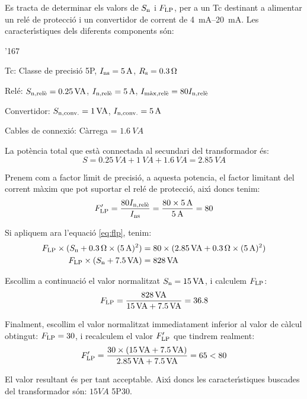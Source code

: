 \begin{exemple}
    Es tracta de determinar els valors de $S_\mathrm{n}$ i $F_\mathrm{LP}$,  per
    a un Tc destinant a alimentar  un rel\'{e} de protecci\'{o} i un convertidor
    de corrent de \SIrange{4}{20}{mA}. Les caracter\'{\i}stiques
    dels diferents components s\'{o}n:
    \begin{dinglist}{'167}
        \item Tc: Classe de precisi\'{o}  5P, $I_\mathrm{ns}=5\mathrm{\,A}$,
        $R_\mathrm{s}=\SI{0,3}{\ensuremath{\mathrm{\Omega}}}$
        \item Rel\'{e}: $S_\mathrm{n,rel\grave{e}}=\SI{0,25}{VA}$,
        $I_\mathrm{n,rel\grave{e}}=5\mathrm{\,A}$, $I_\mathrm{m\grave{a}x,rel\grave{e}}=
        80 I_\mathrm{n,rel\grave{e}}$
        \item Convertidor: $S_\mathrm{n,conv.}=1\mathrm{\,VA}$,
        $I_\mathrm{n,conv.}=5\mathrm{\,A}$
        \item Cables de connexi\'{o}: C\`{a}rrega = $\SI{1,6}{VA}$
    \end{dinglist}

    La pot\`{e}ncia total que est\`{a} connectada al secundari del transformador
    \'{e}s:
    \[
        S = \SI{0,25}{VA} + \SI{1}{VA} + \SI{1,6}{VA} = \SI{2,85}{VA}
    \]

    Prenem com a factor l\'{\i}mit de precisi\'{o},  a aquesta potencia, el
    factor limitant del corrent m\`{a}xim que pot suportar el rel\'{e} de
    protecci\'{o}, aix\'{\i} doncs tenim:
    \[
        F'_\mathrm{LP} = \frac{80 I_\mathrm{n,rel\grave{e}}}{I_\mathrm{ns}} =
        \frac{80\times 5\mathrm{\,A}}{5\mathrm{\,A}} = 80
    \]

    Si apliquem ara l'equaci\'{o} \eqref{eq:flp}, tenim:
    \begin{align*}
        F_\mathrm{LP}\times(S_\mathrm{n}+\SI{0,3}{\ensuremath{\mathrm{\Omega}}} \times (5\mathrm{\,A})^2) &=
        80\times(\SI{2,85}{VA}+\SI{0,3}{\ensuremath{\mathrm{\Omega}}} \times (5\mathrm{\,A})^2) \\
        F_\mathrm{LP}\times(S_\mathrm{n}+\SI{7,5}{VA}) &= 828\mathrm{\,VA}
    \end{align*}

    Escollim a continuaci\'{o} el valor normalitzat $S_\mathrm{n}=
    15\mathrm{\,VA}$, i calculem $F_\mathrm{LP}$:
    \[
        F_\mathrm{LP} = \frac{828\mathrm{\,VA}}{15\mathrm{\,VA}+\SI{7,5}{VA}}
        = \num{36,8}
    \]

    Finalment, escollim el valor normalitzat immediatament inferior al valor
    de c\`{a}lcul obtingut: $F_\mathrm{LP} = 30$, i
    recalculem el valor $F'_\mathrm{LP}$ que tindrem realment:
    \[
    F'_\mathrm{LP} = \frac{30\times(15\mathrm{\,VA} + \SI{7,5}{VA})}
    {\SI{2,85}{VA} + \SI{7,5}{VA}} = 65 < 80
    \]

    El valor resultant \'{e}s per tant acceptable. Aix\'{\i} doncs les
    caracter\'{\i}stiques buscades del transformador s\'{o}n: $15\unit{VA}$ 5P30.
\end{exemple}


